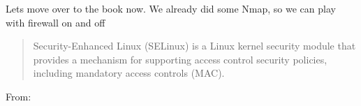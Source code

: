 \documentclass[Screen16to9,17pt]{foils}
\begin{document}
\begin{list2}
\item Lets move over to the book now. We already did some Nmap, so we can play with firewall on and off
\end{list2}




\begin{quote}
Security-Enhanced Linux (SELinux) is a Linux kernel security module that provides a mechanism for supporting access control security policies, including mandatory access controls (MAC).
\end{quote}
From:



\slidenext
\end{document}
